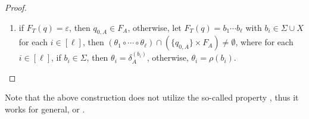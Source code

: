 \begin{proof}
\begin{enumerate}
  \item if $F_T(q) = \varepsilon$, then $q_{0, A}  \in F_A$, otherwise, 
let $F_T(q) = b_1 \cdots b_\ell$ with $b_i \in \Sigma \cup X$ for each $i \in [\ell]$, then $(\theta_1 \circ \cdots \circ \theta_\ell) \cap (\{q_{0,A}\} \times F_A) \neq \emptyset$, where for each $i \in [\ell]$, if $b_i \in \Sigma$, then $\theta_i = \delta^{(b_i)}_A$, otherwise, $\theta_i = \rho(b_i)$.
\end{enumerate}
\end{proof}

Note that the above construction  does not utilize the so-called  property \cite{AC10,AD11},
  thus it works for general, or  \PSST{} \cite{FR17}.




